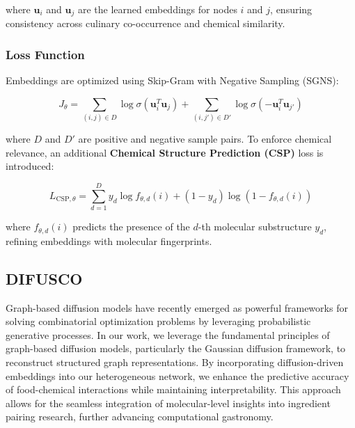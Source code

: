 where \( \mathbf{u}_i \) and \( \mathbf{u}_j \) are the learned embeddings for nodes \( i \) and \( j \), ensuring consistency across culinary co-occurrence and chemical similarity.

\subsubsection{Loss Function}

Embeddings are optimized using Skip-Gram with Negative Sampling (SGNS):

\begin{equation*}
    J_{\theta} = \sum_{(i, j) \in D} \log \sigma(\mathbf{u}_i^T \mathbf{u}_j) + \sum_{(i, j') \in D'} \log \sigma(-\mathbf{u}_i^T \mathbf{u}_{j'})
\end{equation*}

where \( D \) and \( D' \) are positive and negative sample pairs. To enforce chemical relevance, an additional \textbf{Chemical Structure Prediction (CSP)} loss is introduced:

\begin{equation*}
    L_{\text{CSP}, \theta} = \sum_{d=1}^{D} y_d \log f_{\theta, d}(i) + (1 - y_d) \log (1 - f_{\theta, d}(i))
\end{equation*}

where \( f_{\theta, d}(i) \) predicts the presence of the \( d \)-th molecular substructure \( y_d \), refining embeddings with molecular fingerprints.

\subsection{DIFUSCO}

Graph-based diffusion models have recently emerged as powerful frameworks for solving combinatorial optimization problems by leveraging probabilistic generative processes. In our work, we leverage the fundamental principles of graph-based diffusion models, particularly the Gaussian diffusion framework, to reconstruct structured graph representations. By incorporating diffusion-driven embeddings into our heterogeneous network, we enhance the predictive accuracy of food-chemical interactions while maintaining interpretability. This approach allows for the seamless integration of molecular-level insights into ingredient pairing research, further advancing computational gastronomy.
